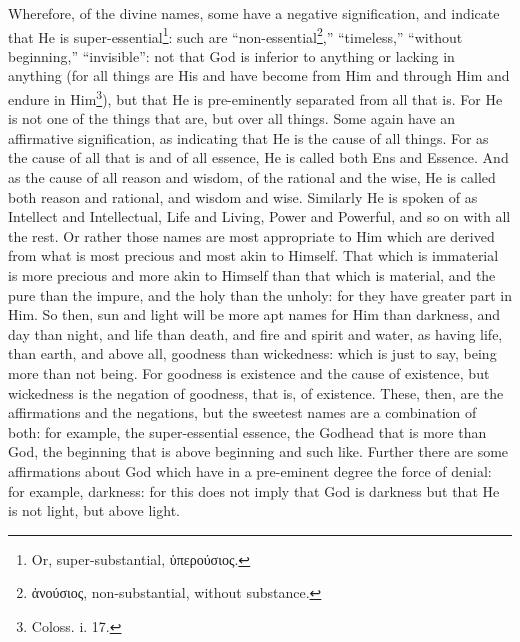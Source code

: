 Wherefore, of the divine names, some have a negative signification, and indicate that He is super-essential\footnote{Or, super-substantial, \textgreek{ὑπερούσιος}.}: such are “non-essential\footnote{\textgreek{ἀνούσιος}, non-substantial, without substance.},” “timeless,” “without beginning,” “invisible”: not that God is inferior to anything or lacking in anything (for all things are His and have become from Him and through Him and endure in Him\footnote{Coloss. i. 17.}), but that He is pre-eminently separated from all that is. For He is not one of the things that are, but over all things. Some again have an affirmative signification, as indicating that He is the cause of all things. For as the cause of all that is and of all essence, He is called both Ens and Essence. And as the cause of all reason and wisdom, of the rational and the wise, He is called both reason and rational, and wisdom and wise. Similarly He is spoken of as Intellect and Intellectual, Life and Living, Power and Powerful, and so on with all the rest. Or rather those names are most appropriate to Him which are derived from what is most precious and most akin to Himself. That which is immaterial is more precious and more akin to Himself than that which is material, and the pure than the impure, and the holy than the unholy: for they have greater part in Him. So then, sun and light will be more apt names for Him than darkness, and day than night, and life than death, and fire and spirit and water, as having life, than earth, and above all, goodness than wickedness: which is just to say, being more than not being. For goodness is existence and the cause of existence, but wickedness is the negation of goodness, that is, of existence. These, then, are the affirmations and the negations, but the sweetest names are a combination of both: for example, the super-essential essence, the Godhead that is more than God, the beginning that is above beginning and such like. Further there are some affirmations about God which have in a pre-eminent degree the force of denial: for example, darkness: for this does not imply that God is darkness but that He is not light, but above light.

